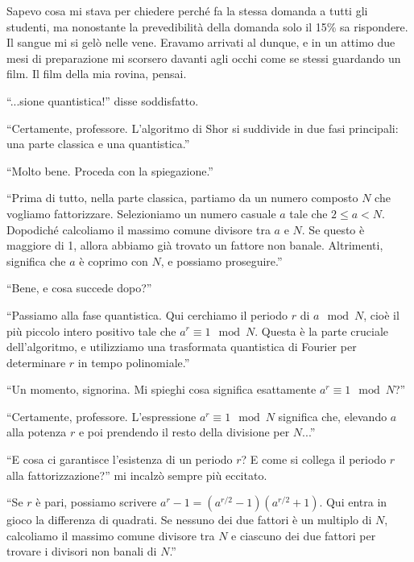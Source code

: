 Sapevo cosa mi stava per chiedere perché fa la stessa domanda a tutti gli studenti, ma nonostante la prevedibilità della domanda solo il 15\% sa rispondere. Il sangue mi si gelò nelle vene. Eravamo arrivati al dunque, e in un attimo due mesi di preparazione mi scorsero davanti agli occhi come se stessi guardando un film. Il film della mia rovina, pensai.

\begin{dialogue}
   \enquote{...sione quantistica!} disse soddisfatto.

 \enquote{Certamente, professore. L'algoritmo di Shor si suddivide in due fasi principali: una parte classica e una quantistica.}

 \enquote{Molto bene. Proceda con la spiegazione.}

 \enquote{Prima di tutto, nella parte classica, partiamo da un numero composto \( N \) che vogliamo fattorizzare. Selezioniamo un numero casuale \( a \) tale che \( 2 \leq a < N \). Dopodiché calcoliamo il massimo comune divisore tra \( a \) e \( N \). Se questo  è maggiore di 1, allora abbiamo già trovato un fattore non banale. Altrimenti, significa che \( a \) è coprimo con \( N \), e possiamo proseguire.}

 \enquote{Bene, e cosa succede dopo?}

 \enquote{Passiamo alla fase quantistica. Qui cerchiamo il periodo \( r \) di \( a \mod N \), cioè il più piccolo intero positivo tale che \( a^r \equiv 1 \mod N \). Questa è la parte cruciale dell'algoritmo, e utilizziamo una trasformata quantistica di Fourier per determinare \( r \) in tempo polinomiale.}


 \enquote{Un momento, signorina. Mi spieghi cosa significa esattamente \( a^r \equiv 1 \mod N \)?}

 \enquote{Certamente, professore. L'espressione \( a^r \equiv 1 \mod N \) significa che, elevando \( a \) alla potenza \( r \) e poi prendendo il resto della divisione per \( N \)...}

 \enquote{E cosa ci garantisce l'esistenza di un periodo \( r \)? E come si collega il periodo \( r \) alla fattorizzazione?} mi incalzò sempre più eccitato.

 \enquote{Se \( r \) è pari, possiamo scrivere \( a^r - 1 = (a^{r/2} - 1)(a^{r/2} + 1) \). Qui entra in gioco la differenza di quadrati. Se nessuno dei due fattori è un multiplo di \( N \), calcoliamo il massimo comune divisore tra \( N \) e ciascuno dei due fattori per trovare i divisori non banali di \( N \).}


\end{dialogue}
